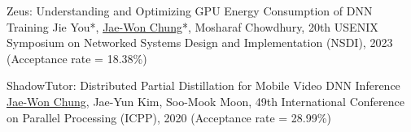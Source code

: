 



\begin{cvlist}

  \cvlistitem
    {Zeus: Understanding and Optimizing GPU Energy Consumption of DNN Training} %
    {Jie You*, \underline{Jae-Won Chung}*, Mosharaf Chowdhury, 20th USENIX Symposium on Networked Systems Design and Implementation (NSDI), 2023 (Acceptance rate = 18.38\%)} %

  \cvlistitem
    {ShadowTutor: Distributed Partial Distillation for Mobile Video DNN Inference} %
    {\underline{Jae-Won Chung}, Jae-Yun Kim, Soo-Mook Moon, 49th International Conference on Parallel Processing (ICPP), 2020 (Acceptance rate = 28.99\%)} %

\end{cvlist}

\vspace{-2mm}
\hspace{0mm}
\\\\
